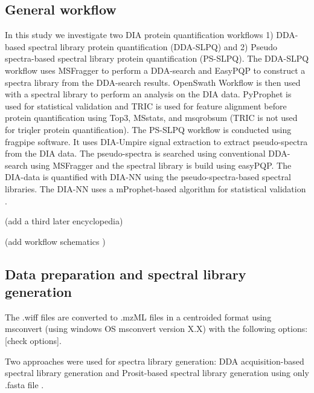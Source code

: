 \documentclass[10pt,letterpaper]{article}
\begin{document}
{\subsection*{General workflow}
In this study we investigate two DIA protein quantification workflows 1) DDA-based spectral library protein quantification (DDA-SLPQ) and 2) Pseudo spectra-based spectral library protein quantification (PS-SLPQ). The DDA-SLPQ workflow uses MSFragger to perform a DDA-search and EasyPQP to construct a spectra library from the DDA-search results. OpenSwath Workflow is then used with a spectral library to perform an analysis on the DIA data. PyProphet is used for statistical validation and TRIC is used for feature alignment before protein quantification using Top3, MSstats, and msqrobsum (TRIC is not used for triqler protein quantification). The PS-SLPQ workflow is conducted using fragpipe software. It uses DIA-Umpire signal extraction to extract pseudo-spectra from the DIA data. The pseudo-spectra is searched using conventional DDA-search using MSFragger and the spectral library is build using easyPQP. The DIA-data is quantified with DIA-NN using the pseudo-spectra-based spectral libraries. The DIA-NN uses a mProphet-based algorithm for statistical validation \cite{reiter2011mprophet} \cite{demichev2020dia}. 

(add a third later encyclopedia) 

(add workflow schematics )

\subsection*{Data preparation and spectral library generation}
The .wiff files are converted to .mzML files in a centroided format using msconvert (using windows OS msconvert version X.X) with the following options: [check options]. 

Two approaches were used for spectra library generation: DDA acquisition-based spectral library generation and Prosit-based spectral library generation using only .fasta file \cite{searle2020generating}. 

}
\end{document}
